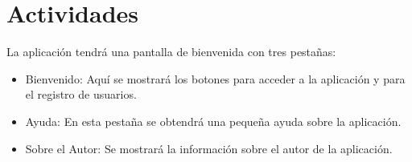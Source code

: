 	\section{Actividades}
		La aplicación tendrá una pantalla de bienvenida con tres pestañas:
		\begin{itemize}
			\item Bienvenido: Aquí se mostrará los botones para acceder a la aplicación y para el registro de usuarios.
			\item Ayuda: En esta pestaña se obtendrá una pequeña ayuda sobre la aplicación.
			\item Sobre el Autor: Se mostrará la información sobre el autor de la aplicación.
		\end{itemize}
		
